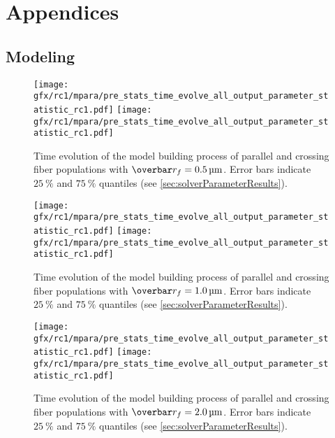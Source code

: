 \newpage\null\thispagestyle{empty}\newpage
\clearpage{\thispagestyle{empty}\cleardoublepage}
\part{Appendices}
%
\chapter{Modeling}
\label{app:modelAnalysis}
%
\setlength{\tikzwidth}{\textwidth}
\begin{figure}[!ht]
    \centering
    \begin{sideways}
        \texttt{[image: gfx/rc1/mpara/pre\_stats\_time\_evolve\_all\_output\_parameter\_statistic\_rc1.pdf]}
        \texttt{[image: gfx/rc1/mpara/pre\_stats\_time\_evolve\_all\_output\_parameter\_statistic\_rc1.pdf]}
    \end{sideways}
    \label{app:pste1}
    \caption{Time evolution of the model building process of parallel and crossing fiber populations with $\fiberRadiusMean=\SI{0.5}{\micro\meter}$. Error bars indicate $\SI{25}{\percent}$ and $\SI{75}{\percent}$ quantiles (see \cref{sec:solverParameterResults}).}
\end{figure}
%
\begin{figure}[!ht]
    \centering
    \begin{sideways}
        \texttt{[image: gfx/rc1/mpara/pre\_stats\_time\_evolve\_all\_output\_parameter\_statistic\_rc1.pdf]}
        \texttt{[image: gfx/rc1/mpara/pre\_stats\_time\_evolve\_all\_output\_parameter\_statistic\_rc1.pdf]}
    \end{sideways}
    \label{app:pste2}
    \caption{Time evolution of the model building process of parallel and crossing fiber populations with $\fiberRadiusMean=\SI{1.0}{\micro\meter}$. Error bars indicate $\SI{25}{\percent}$ and $\SI{75}{\percent}$ quantiles (see \cref{sec:solverParameterResults}).}
\end{figure}
%
\begin{figure}[!ht]
    \centering
    \begin{sideways}
        \texttt{[image: gfx/rc1/mpara/pre\_stats\_time\_evolve\_all\_output\_parameter\_statistic\_rc1.pdf]}
        \texttt{[image: gfx/rc1/mpara/pre\_stats\_time\_evolve\_all\_output\_parameter\_statistic\_rc1.pdf]}
    \end{sideways}
    \label{app:pste3}
    \caption{Time evolution of the model building process of parallel and crossing fiber populations with $\fiberRadiusMean=\SI{2.0}{\micro\meter}$. Error bars indicate $\SI{25}{\percent}$ and $\SI{75}{\percent}$ quantiles (see \cref{sec:solverParameterResults}).}
\end{figure}
